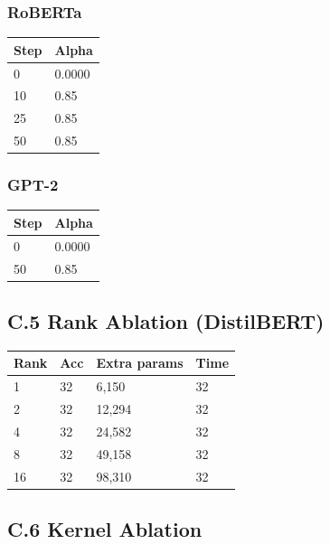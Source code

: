 \subsubsection{RoBERTa}

\begin{table}[H]
\centering
\small
\begin{tabular}{ll}
\toprule
\textbf{Step} & \textbf{Alpha} \\
\midrule
0 & 0.0000 \\
10 & 0.85 \\
25 & 0.85 \\
50 & 0.85 \\
\bottomrule
\end{tabular}
\end{table}

\subsubsection{GPT-2}

\begin{table}[H]
\centering
\small
\begin{tabular}{ll}
\toprule
\textbf{Step} & \textbf{Alpha} \\
\midrule
0 & 0.0000 \\
50 & 0.85 \\
\bottomrule
\end{tabular}
\end{table}

\subsection{C.5 Rank Ablation (DistilBERT)}

\begin{table}[H]
\centering
\small
\begin{tabular}{llll}
\toprule
\textbf{Rank} & \textbf{Acc} & \textbf{Extra params} & \textbf{Time} \\
\midrule
1 & 32 & 6,150 & 32 \\
2 & 32 & 12,294 & 32 \\
4 & 32 & 24,582 & 32 \\
8 & 32 & 49,158 & 32 \\
16 & 32 & 98,310 & 32 \\
\bottomrule
\end{tabular}
\end{table}

\subsection{C.6 Kernel Ablation}

